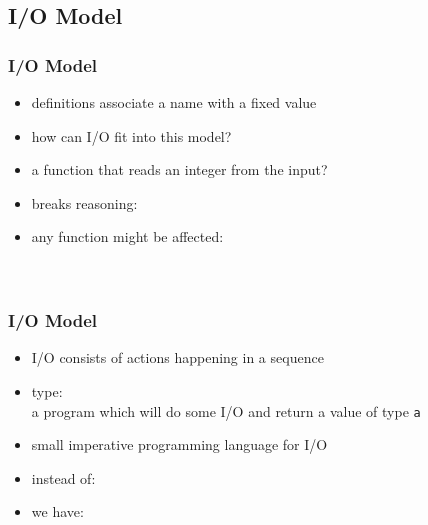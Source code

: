 \documentclass[dvipsnames]{beamer}
\theoremstyle{plain}
\begin{document}
\subsection{I/O Model}

\begin{frame}
  \frametitle{I/O Model}

  \begin{itemize}
    \item definitions associate a name with a fixed value
    \item how can I/O fit into this model?

    \pause
    \bigskip
    \item a function that reads an integer from the input?\\
      \smallskip

    \pause
    \item breaks reasoning:\\
      \smallskip
    \item any function might be affected:\\
      \smallskip
      \\
      \\
  \end{itemize}
\end{frame}

\begin{frame}
  \frametitle{I/O Model}

  \begin{itemize}
    \item I/O consists of \alert{actions} happening in a sequence

    \medskip
    \item type: \\
      a program which will do some I/O and return a value of type \texttt{a}
    \item small imperative programming language for I/O

    \pause
    \medskip
    \item instead of:\\
      \smallskip
    \item we have:\\
      \smallskip
  \end{itemize}
\end{frame}
\end{document}
